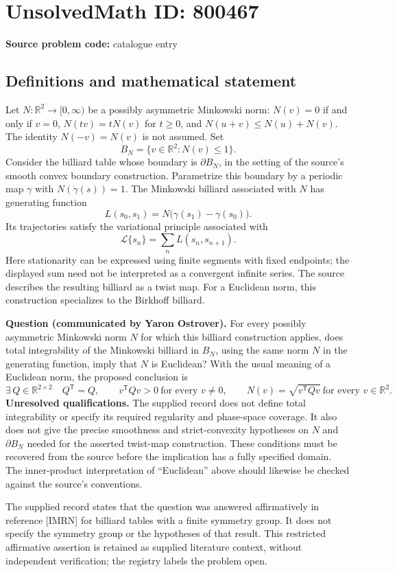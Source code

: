 \documentclass[11pt]{article}
\newcommand{\R}{\mathbb{R}}
\begin{document}
\section*{UnsolvedMath ID: 800467}
\textbf{Source problem code:} catalogue entry
\subsection{Definitions and mathematical statement}
Let \(N:\R^2\to[0,\infty)\) be a possibly asymmetric Minkowski norm: \(N(v)=0\) if and only if \(v=0\), \(N(tv)=tN(v)\) for \(t\geq0\), and \(N(u+v)\leq N(u)+N(v)\). The identity \(N(-v)=N(v)\) is not assumed. Set
\[
B_N=\{v\in\R^2:N(v)\leq1\}.
\]
Consider the billiard table whose boundary is \(\partial B_N\), in the setting of the source's smooth convex boundary construction. Parametrize this boundary by a periodic map \(\gamma\) with \(N(\dot\gamma(s))=1\). The Minkowski billiard associated with \(N\) has generating function
\[
L(s_0,s_1)=N\bigl(\gamma(s_1)-\gamma(s_0)\bigr).
\]
Its trajectories satisfy the variational principle associated with
\[
\mathcal L\{s_n\}=\sum_n L(s_n,s_{n+1}).
\]
Here stationarity can be expressed using finite segments with fixed endpoints; the displayed sum need not be interpreted as a convergent infinite series. The source describes the resulting billiard as a twist map. For a Euclidean norm, this construction specializes to the Birkhoff billiard.

\textbf{Question (communicated by Yaron Ostrover).} For every possibly asymmetric Minkowski norm \(N\) for which this billiard construction applies, does total integrability of the Minkowski billiard in \(B_N\), using the same norm \(N\) in the generating function, imply that \(N\) is Euclidean? With the usual meaning of a Euclidean norm, the proposed conclusion is
\[
\exists\,Q\in\R^{2\times2}\quad
Q^{\mathsf T}=Q,\qquad
v^{\mathsf T}Qv>0\ \text{for every }v\ne0,\qquad
N(v)=\sqrt{v^{\mathsf T}Qv}\ \text{for every }v\in\R^2.
\]
\textbf{Unresolved qualifications.} The supplied record does not define total integrability or specify its required regularity and phase-space coverage. It also does not give the precise smoothness and strict-convexity hypotheses on \(N\) and \(\partial B_N\) needed for the asserted twist-map construction. These conditions must be recovered from the source before the implication has a fully specified domain. The inner-product interpretation of ``Euclidean'' above should likewise be checked against the source's conventions.

The supplied record states that the question was answered affirmatively in reference [IMRN] for billiard tables with a finite symmetry group. It does not specify the symmetry group or the hypotheses of that result. This restricted affirmative assertion is retained as supplied literature context, without independent verification; the registry labels the problem open.
\end{document}
